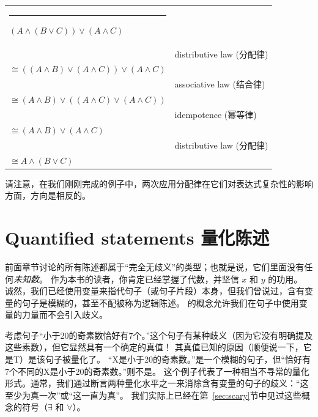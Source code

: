 \medskip

\begin{center}
\begin{tabular}{p{2in}p{2in}}
\rule{10pt}{0pt} $(A \land (B \lor C)) \lor (A \land C)$ & \\
 & distributive law (分配律)\\
$\cong  ((A \land B) \lor (A \land C)) \lor (A \land C)$ & \\
 & associative law (结合律)\\
$\cong  (A \land B) \lor ((A \land C) \lor (A \land C))$ & \\
 & idempotence (幂等律) \\
$\cong (A \land B) \lor (A \land C) $ & \\
 & distributive law (分配律)\\
$\cong A \land (B \lor C)$ & \\
\end{tabular}
\end{center}
\medskip

请注意，在我们刚刚完成的例子中，两次应用分配律在它们对表达式复杂性的影响方面，方向是相反的。

\clearpage






\newpage

\section{Quantified statements 量化陈述}
\label{sec:quant}

前面章节讨论的所有陈述都属于“完全无歧义”的类型；也就是说，它们里面没有任何{\em 未知数}。
作为本书的读者，你肯定已经掌握了代数，并坚信 $x$ 和 $y$ 的功用。
诚然，我们已经使用变量来指代句子（或句子片段）本身，但我们曾说过，含有变量的句子是模糊的，甚至不配被称为逻辑陈述。
的概念允许我们在句子中使用变量的力量而不会引入歧义。

考虑句子“小于20的奇素数恰好有7个。”这个句子有某种歧义（因为它没有明确提及这些素数），但它显然具有一个确定的真值！
其真值已知的原因（顺便说一下，它是T）是该句子被量化了。
“X是小于20的奇素数。”是一个模糊的句子，但“恰好有7个不同的X是小于20的奇素数。”则不是。
这个例子代表了一种相当不寻常的量化形式。通常，我们通过断言两种量化水平之一来消除含有变量的句子的歧义：“这至少为真一次”或“这一直为真”。
我们实际上已经在第~\ref{sec:scary}节中见过这些概念的符号（$\exists$ 和 $\forall$）。

